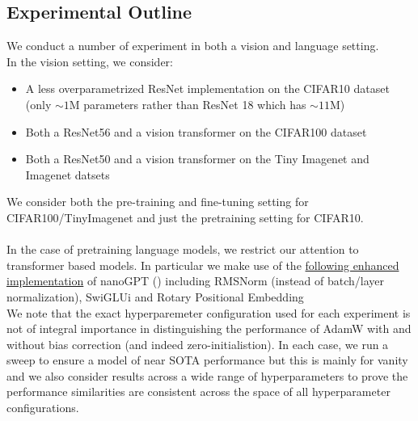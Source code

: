\documentclass[12pt]{book}
\begin{document}
\subsection*{Experimental Outline}
We conduct a number of experiment in both a vision and language setting. \\
In the vision setting, we consider:
\begin{itemize}
\item A less overparametrized ResNet implementation on the CIFAR10 dataset (only $\sim 1$M parameters rather than ResNet 18 which has $\sim 11$M)
\item Both a ResNet56\footnotemark{} and a vision transformer on the CIFAR100 dataset
\item Both a ResNet50 and a vision transformer on the Tiny Imagenet and Imagenet datsets
\end{itemize}
We consider both the pre-training and fine-tuning setting for CIFAR100/TinyImagenet and just the pretraining setting for CIFAR10.\\
\\
In the case of pretraining language models, we restrict our attention to transformer based models. In particular we make use of the \href{https://github.com/Niccolo-Ajroldi/plainLM/tree/main}{following enhanced implementation} of nanoGPT (\cite{Karpathy2022}) including RMSNorm (instead of batch/layer normalization), SwiGLUi\cite{swiGLU} and Rotary Positional Embedding
\\
We note that the exact hyperparemeter configuration used for each experiment is not of integral importance in distinguishing the performance of AdamW with and without bias correction (and indeed zero-initialistion). In each case, we run a sweep to ensure a model of near SOTA performance but this is mainly for vanity and we also consider results across a wide range of hyperparameters to prove the performance similarities are consistent across the space of all hyperparameter configurations. 
\\
\end{document}
